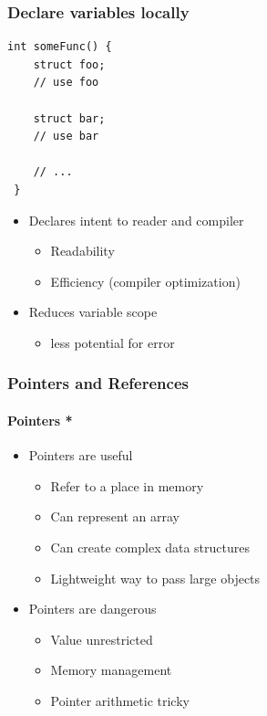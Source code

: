 \documentclass[table]{beamer}
\newcounter{rulecount}
\newcommand{\declarerule}{\textbf{\color{themeblue}{Rule \therulecount:}} }
\newcommand{\declarelesson}{\textbf{\color{themegreen}{Lesson:}} }
\begin{document}
\begin{frame}[fragile]
    \frametitle{\declarerule Declare variables locally}
    \begin{lstlisting}[title=In C++ variables can be declared in the middle of scope where they are used]
int someFunc() {
    struct foo;
    // use foo

    struct bar;
    // use bar

    // ...
 }
    \end{lstlisting}
    \begin{itemize}
        \item Declares intent to reader and compiler
            \begin{itemize}
                \item \alert{Readability}
                \item \alert{Efficiency} (compiler optimization)
            \end{itemize}
        \item Reduces variable scope
            \begin{itemize}
                \item less potential for error
            \end{itemize}
    \end{itemize}
\end{frame}


\begin{frame}
    \frametitle{\declarelesson Pointers and References}
    \framesubtitle{Pointers *}
    \begin{itemize}
        \item Pointers are useful
            \begin{itemize}
                \item Refer to a place in memory
                \item Can represent an array
                \item Can create complex data structures
                \item Lightweight way to pass large objects
            \end{itemize}
        \item Pointers are dangerous
            \begin{itemize}
                \item Value unrestricted
                \item Memory management
                \item Pointer arithmetic tricky
            \end{itemize}
    \end{itemize}
\end{frame}
\end{document}
